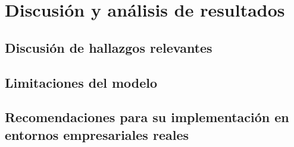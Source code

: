 \chapter{Discusión y análisis de resultados}
\section{Discusión de hallazgos relevantes}
\section{Limitaciones del modelo}
\section{Recomendaciones para su implementación en entornos empresariales reales}